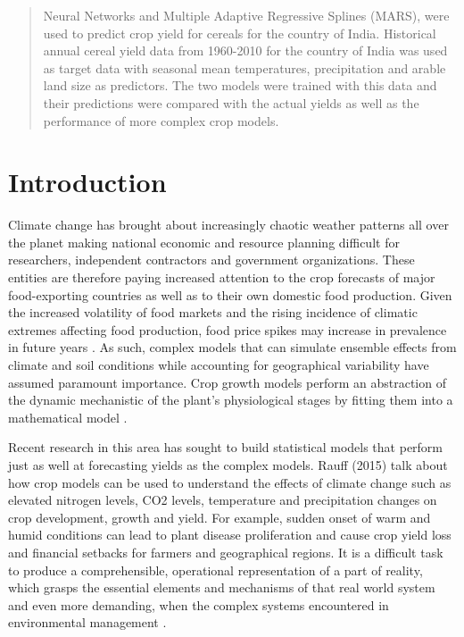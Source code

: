 \documentclass[conference]{IEEEtran}
\begin{document}
\begin{abstract}
Neural Networks and Multiple Adaptive Regressive Splines (MARS), were used to predict crop yield for cereals for the country of India. Historical annual cereal yield data from 1960-2010 for the country of India was used as target data with seasonal mean temperatures, precipitation and arable land size as predictors. The two models were trained with this data and their predictions were compared with the actual yields as well as the performance of more complex crop models. 
\end{abstract}

\IEEEpeerreviewmaketitle



\section{Introduction}
Climate change has brought about increasingly chaotic weather patterns all over the planet making national economic and resource planning difficult for researchers, independent contractors and government organizations. These entities are therefore paying increased attention to the crop forecasts of major food-exporting countries as well as to their own domestic food production. Given the increased volatility of food markets and the rising incidence of climatic extremes affecting food production, food price spikes may increase in prevalence in future years \cite{iizumi2013prediction}. As such, complex models that can simulate ensemble effects from climate and soil conditions while accounting for geographical variability have assumed paramount importance. Crop growth models perform an abstraction of the dynamic mechanistic of the plant’s physiological stages by fitting them into a mathematical model \cite{Gonzalez-Sanchez2014}.

Recent research in this area has sought to build statistical models that perform just as well at forecasting yields as the complex models. Rauff (2015) \cite{Rauff2015} talk about how crop models can be used to understand the effects of climate change such as elevated nitrogen levels, CO2 levels, temperature and precipitation changes on crop development, growth and yield. For example, sudden onset of warm and humid conditions can lead to plant disease proliferation and cause crop yield loss and financial setbacks for farmers and geographical regions. It is a difficult task to produce a comprehensible, operational representation of a part of reality, which grasps the essential elements and mechanisms of that real world system and even more demanding, when the complex systems encountered in environmental management \cite{Rauff2015}.
\end{document}
